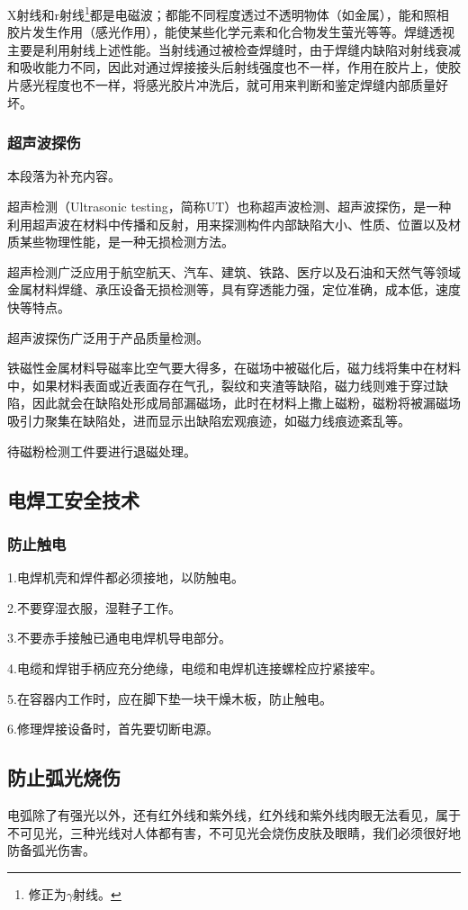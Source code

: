 \documentclass{ctexbook}
\begin{document}
X射线和r射线\footnote{修正为$\gamma$射线。}都是电磁波；都能不同程度透过不透明物体（如金属），能和照相胶片发生作用（感光作用），能使某些化学元素和化合物发生萤光等等。焊缝透视主要是利用射线上述性能。当射线通过被检查焊缝时，由于焊缝内缺陷对射线衰减和吸收能力不同，因此对通过焊接接头后射线强度也不一样，作用在胶片上，使胶片感光程度也不一样，将感光胶片冲洗后，就可用来判断和鉴定焊缝内部质量好坏。
\subsubsection{超声波探伤}
本段落为补充内容。

超声检测（Ultrasonic testing，简称UT）也称超声波检测、超声波探伤，是一种利用超声波在材料中传播和反射，用来探测构件内部缺陷大小、性质、位置以及材质某些物理性能，是一种无损检测方法。

超声检测广泛应用于航空航天、汽车、建筑、铁路、医疗以及石油和天然气等领域金属材料焊缝、承压设备无损检测等，具有穿透能力强，定位准确，成本低，速度快等特点。 

超声波探伤广泛用于产品质量检测。

铁磁性金属材料导磁率比空气要大得多，在磁场中被磁化后，磁力线将集中在材料中，如果材料表面或近表面存在气孔，裂纹和夹渣等缺陷，磁力线则难于穿过缺陷，因此就会在缺陷处形成局部漏磁场，此时在材料上撒上磁粉，磁粉将被漏磁场吸引力聚集在缺陷处，进而显示出缺陷宏观痕迹，如磁力线痕迹紊乱等。

待磁粉检测工件要进行退磁处理。
\subsection{电焊工安全技术}
\subsubsection{防止触电}
1.电焊机壳和焊件都必须接地，以防触电。

2.不要穿湿衣服，湿鞋子工作。

3.不要赤手接触已通电电焊机导电部分。

4.电缆和焊钳手柄应充分绝缘，电缆和电焊机连接螺栓应拧紧接牢。

5.在容器内工作时，应在脚下垫一块干燥木板，防止触电。

6.修理焊接设备时，首先要切断电源。
\subsection{防止弧光烧伤}
电弧除了有强光以外，还有红外线和紫外线，红外线和紫外线肉眼无法看见，属于不可见光，三种光线对人体都有害，不可见光会烧伤皮肤及眼睛，我们必须很好地防备弧光伤害。
\end{document}
